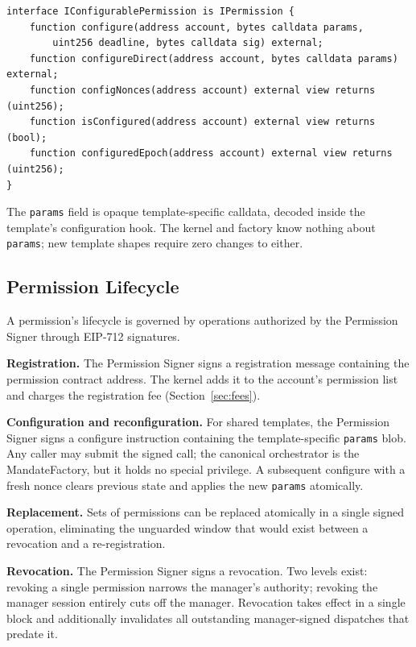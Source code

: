 \documentclass[11pt]{article}
\begin{document}
\begin{lstlisting}
interface IConfigurablePermission is IPermission {
    function configure(address account, bytes calldata params,
        uint256 deadline, bytes calldata sig) external;
    function configureDirect(address account, bytes calldata params) external;
    function configNonces(address account) external view returns (uint256);
    function isConfigured(address account) external view returns (bool);
    function configuredEpoch(address account) external view returns (uint256);
}
\end{lstlisting}

The \texttt{params} field is opaque template-specific calldata, decoded inside the template's configuration hook. The kernel and factory know nothing about \texttt{params}; new template shapes require zero changes to either.

\subsection{Permission Lifecycle}

A permission's lifecycle is governed by operations authorized by the Permission Signer through EIP-712 signatures.

\textbf{Registration.} The Permission Signer signs a registration message containing the permission contract address. The kernel adds it to the account's permission list and charges the registration fee (Section~\ref{sec:fees}).

\textbf{Configuration and reconfiguration.} For shared templates, the Permission Signer signs a configure instruction containing the template-specific \texttt{params} blob. Any caller may submit the signed call; the canonical orchestrator is the MandateFactory, but it holds no special privilege. A subsequent configure with a fresh nonce clears previous state and applies the new \texttt{params} atomically.

\textbf{Replacement.} Sets of permissions can be replaced atomically in a single signed operation, eliminating the unguarded window that would exist between a revocation and a re-registration.

\textbf{Revocation.} The Permission Signer signs a revocation. Two levels exist: revoking a single permission narrows the manager's authority; revoking the manager session entirely cuts off the manager. Revocation takes effect in a single block and additionally invalidates all outstanding manager-signed dispatches that predate it.
\end{document}
